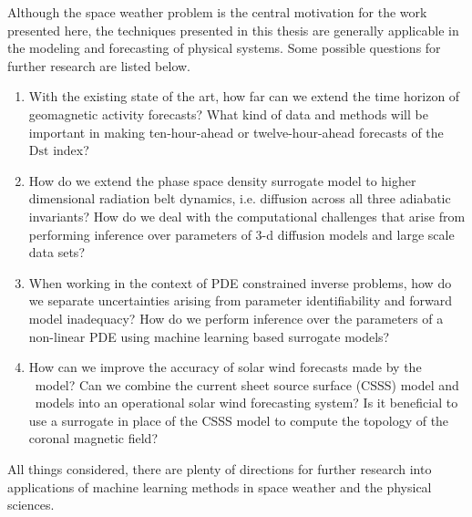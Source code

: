 Although the space weather problem is the central motivation for the work 
presented here, the techniques presented in this thesis are generally 
applicable in the modeling and forecasting of physical systems. Some possible 
questions for further research are listed below.
%
\begin{enumerate}
    \item With the existing state of the art, how far can we extend the time 
          horizon of geomagnetic activity forecasts? What kind of data and 
          methods will be important in making ten-hour-ahead or 
          twelve-hour-ahead forecasts of the $\mathrm{Dst}$ index?
    \item How do we extend the phase space density surrogate model to higher 
          dimensional radiation belt dynamics, i.e. diffusion across all three 
          adiabatic invariants? How do we deal with the computational 
          challenges that arise from performing inference over parameters of 
          $3$-d diffusion models and large scale data sets? 
    \item When working in the context of PDE constrained inverse problems, how 
          do we separate uncertainties arising from parameter identifiability 
          and forward model inadequacy? How do we perform inference over the 
          parameters of a non-linear PDE using machine learning based 
          surrogate models?
    \item How can we improve the accuracy of solar wind forecasts made by the 
          \XX \ model? Can we combine the current sheet source surface (CSSS) 
          model and \XX \ models into an operational solar wind forecasting 
          system? Is it beneficial to use a surrogate in place of the CSSS 
          model to compute the topology of the coronal magnetic field? 
\end{enumerate}
%
All things considered, there are plenty of directions for further research into 
applications of machine learning methods in space weather and the physical 
sciences.
